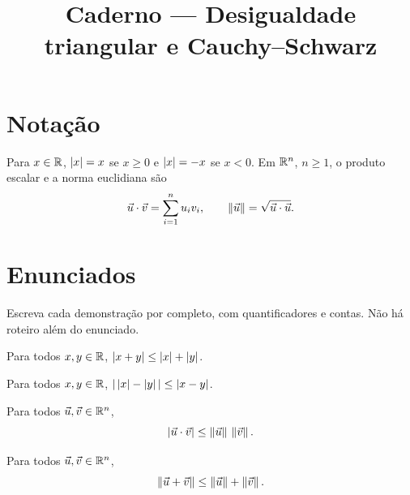 \documentclass[11pt,a4paper]{article}
\title{Caderno --- Desigualdade triangular e Cauchy--Schwarz}
\author{}
\date{}
\begin{document}
\maketitle
\tableofcontents

\section*{Notação}

Para $x\in\mathbb{R}$, $\left\lvert x \right\rvert=x$ se $x\ge 0$ e $\left\lvert x \right\rvert=-x$ se $x<0$. Em $\mathbb{R}^n$, $n\ge 1$, o produto escalar e a norma euclidiana são
\[
\vec{u}\cdot\vec{v}=\sum_{i=1}^n u_i v_i,\qquad
\left\lVert \vec{u} \right\rVert=\sqrt{\vec{u}\cdot\vec{u}}.
\]

\section*{Enunciados}

Escreva cada demonstração por completo, com quantificadores e contas. Não há roteiro além do enunciado.

\begin{teorema}
Para todos $x,y\in\mathbb{R}$, $\left\lvert x+y \right\rvert\le\left\lvert x \right\rvert+\left\lvert y \right\rvert$.
\end{teorema}

\vspace{7.5cm}

\begin{corolario}
Para todos $x,y\in\mathbb{R}$, $\left\lvert \,\left\lvert x \right\rvert-\left\lvert y \right\rvert\, \right\rvert\le\left\lvert x-y \right\rvert$.
\end{corolario}

\vspace{7.5cm}

\begin{teorema}
Para todos $\vec{u},\vec{v}\in\mathbb{R}^n$,
\[
\left\lvert \vec{u}\cdot\vec{v} \right\rvert\le\left\lVert \vec{u} \right\rVert\,\left\lVert \vec{v} \right\rVert.
\]
\end{teorema}

\vspace{9cm}

\begin{teorema}
Para todos $\vec{u},\vec{v}\in\mathbb{R}^n$,
\[
\left\lVert \vec{u}+\vec{v} \right\rVert\le\left\lVert \vec{u} \right\rVert+\left\lVert \vec{v} \right\rVert.
\]
\end{teorema}

\vspace{8cm}
\end{document}
